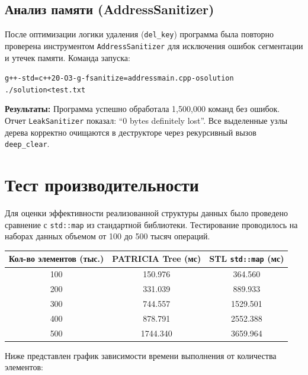 \documentclass[unicode, 12pt, a4paper,oneside,fleqn]{article}
\begin{document}
\subsection{Анализ памяти (AddressSanitizer)}
После оптимизации логики удаления (\texttt{del\_key}) программа была повторно проверена инструментом \texttt{AddressSanitizer} для исключения ошибок сегментации и утечек памяти.
Команда запуска:
\begin{alltt}
g++ -std=c++20 -O3 -g -fsanitize=address main.cpp -o solution
./solution < test.txt
\end{alltt}

\textbf{Результаты:}
Программа успешно обработала 1,500,000 команд без ошибок. Отчет \texttt{LeakSanitizer} показал: \enquote{0 bytes definitely lost}. Все выделенные узлы дерева корректно очищаются в деструкторе через рекурсивный вызов \texttt{deep\_clear}.

\pagebreak

\section{Тест производительности}
Для оценки эффективности реализованной структуры данных было проведено сравнение с \texttt{std::map} из стандартной библиотеки. Тестирование проводилось на наборах данных объемом от 100 до 500 тысяч операций.

\begin{center}
\begin{tabular}{|c|c|c|}
\hline
Кол-во элементов (тыс.) & PATRICIA Tree (мс) & STL \texttt{std::map} (мс) \\ \hline
100 & 150.976 & 364.560 \\ \hline
200 & 331.039 & 889.933 \\ \hline
300 & 744.557 & 1529.501 \\ \hline
400 & 878.791 & 2552.388 \\ \hline
500 & 1744.340 & 3659.964 \\ \hline
\end{tabular}
\end{center}

Ниже представлен график зависимости времени выполнения от количества элементов:
\end{document}
